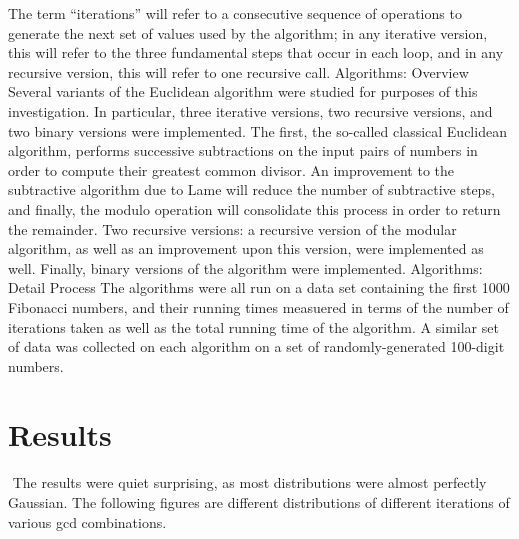 \documentclass[11pt]{article}
\begin{document}
The term “iterations” will refer to a consecutive sequence of operations to generate the next set of values used by the algorithm; in any iterative version, this will refer to the three fundamental steps that occur in each loop, and in any recursive version, this will refer to one recursive call.
Algorithms: Overview
Several variants of the Euclidean algorithm were studied for purposes of this investigation. In particular, three iterative versions, two recursive versions, and two binary versions were implemented. The first, the so-called classical Euclidean algorithm, performs successive subtractions on the input pairs of numbers in order to compute their greatest common divisor.  An improvement to the subtractive algorithm due to Lame will reduce the number of subtractive steps, and finally, the modulo operation will consolidate this process in order to return the remainder. Two recursive versions: a recursive version of the modular algorithm, as well as an improvement upon this version, were implemented as well. Finally, binary versions of the algorithm were implemented.
Algorithms: Detail
Process
The algorithms were all run on a data set containing the first 1000 Fibonacci numbers, and their running times measuered in terms of the number of iterations taken as well as the total running time of the algorithm. A similar set of data was collected on each algorithm on a set of randomly-generated 100-digit numbers. 


\section{Results}$ $	\indent The results were quiet surprising, as most distributions were almost perfectly Gaussian. The following figures are different distributions of different iterations of various gcd combinations.\\
	
\end{document}
